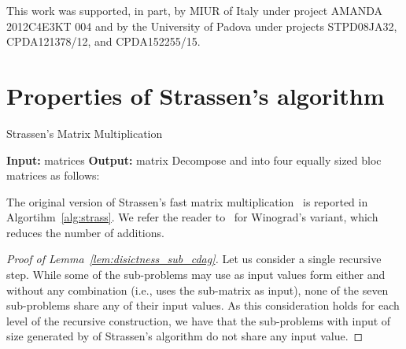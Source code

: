 \documentclass[a4paper,UKenglish]{lipics-v2016}
\begin{document}
This work was supported, in part, by MIUR of Italy under project
AMANDA 2012C4E3KT 004 and by the University of Padova under projects
STPD08JA32, CPDA121378/12, and CPDA152255/15.






\clearpage

\appendix
\section{Properties of Strassen's algorithm}

\begin{algorithm}
\caption{Strassen's Matrix Multiplication}\label{alg:strass}
\begin{algorithmic}[1]
	\Statex \textbf{Input:} matrices 
	\Statex \textbf{Output:} matrix 
	\If{}
	\State 
	\Else
	\State Decompose  and  into four equally sized bloc matrices as follows:
	\Statex 
\State 
\State 
\State 
\State 
\State 
\State 
\State 
\State  
\State 
\State 
\State 
\EndIf
\Return 
\EndProcedure
\end{algorithmic}
\end{algorithm}

The original version of  Strassen's fast matrix multiplication~\cite{strassen1969gaussian} is reported in Algortihm~\ref{alg:strass}. We refer the reader to~\cite{winograd1971multiplication} for
Winograd's variant, which reduces the number of additions. 

\label{app:proof_encoder}
\begin{proof}[Proof of Lemma~\ref{lem:disictness_sub_cdag}]
	Let us consider a single recursive step. While some of the sub-problems may use as input values form either  and  without any combination (i.e.,  uses the sub-matrix  as input), none of the seven sub-problems share any of their input values. As this consideration holds for each level of the recursive construction, we have that the  sub-problems with input of size  generated by of Strassen's algorithm do not share any input value.
\end{proof}
\end{document}
